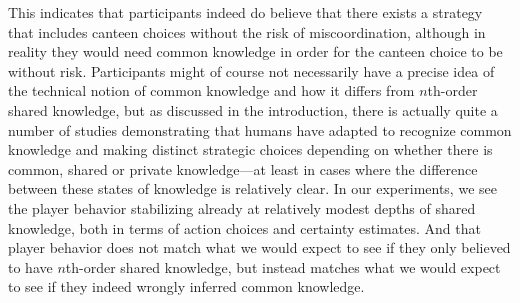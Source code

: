 \documentclass[twocolumn,a4paper,superscriptaddress,nofootinbib]{revtex4}
\newcommand{\tobo}[1]{{\color{red} TOBO: #1}}
\newcommand{\tsn}[1]{{\color{blue} TSN: #1}}
\newcommand{\re}[1]{{\color{brown} RE: #1}}
\begin{document}
This indicates that participants indeed do believe that there exists a strategy that includes canteen choices without the risk of miscoordination, although in reality they would need common knowledge in order for the canteen choice to be without risk.
Participants might of course not necessarily have a precise idea of the technical notion of common knowledge and how it differs from $n$th-order shared knowledge, but as discussed in the introduction, there is actually quite a number of studies demonstrating that humans have adapted to recognize common knowledge and making distinct strategic choices depending on whether there is common, shared or private knowledge---at least in cases where the difference between these states of knowledge is relatively clear. In our experiments, we see the player behavior stabilizing already at relatively modest depths of shared knowledge, both in terms of action choices and certainty estimates. And that player behavior does not match what we would expect to see if they only believed to have $n$th-order shared knowledge, but instead matches what we would 
expect to see if they indeed wrongly inferred common knowledge. 
\end{document}
